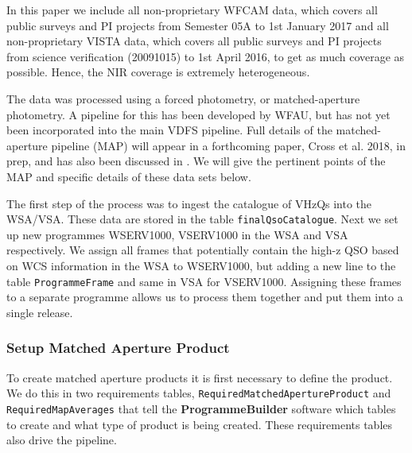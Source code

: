 \documentclass[usenatbib]{mnras}
\begin{document}
In this paper we include all non-proprietary WFCAM data, which covers all
public surveys and PI projects from Semester 05A to 1st January 2017 and all
non-proprietary VISTA data, which covers all public surveys and PI projects from
science verification (20091015) to 1st April 2016, to get as much coverage as
possible. Hence, the NIR coverage is extremely heterogeneous. 

The data was processed using a forced photometry, or matched-aperture
photometry. A pipeline for this has been developed by WFAU, but
has not yet been incorporated into the main VDFS pipeline. Full details of the
matched-aperture pipeline (MAP) will appear in a forthcoming paper, Cross et al.
2018, in prep, and has also been discussed in \citet{Cross2013}.  
We will give the pertinent points of the MAP and specific details of these data sets below.
   
The first step of the process was to ingest the catalogue of VHzQs into
the WSA/VSA. These data are stored in the table \verb+finalQsoCatalogue+. Next we set
up new programmes WSERV1000, VSERV1000 in the WSA and VSA respectively. We
assign all frames that potentially contain the high-z QSO based on WCS information in the
WSA to WSERV1000, but adding a new line to the table \verb+ProgrammeFrame+ and
same in VSA for VSERV1000. Assigning these frames to a separate programme allows
us to process them together and put them into a single release. 
    
\subsubsection{Setup Matched Aperture Product}
To create matched aperture products it is first necessary to define
the product. We do this in two requirements tables,
\verb+RequiredMatchedApertureProduct+ and \verb+RequiredMapAverages+
that tell the \textbf{ProgrammeBuilder} software which tables to
create and what type of product is being created. These requirements
tables also drive the pipeline.
\end{document}
